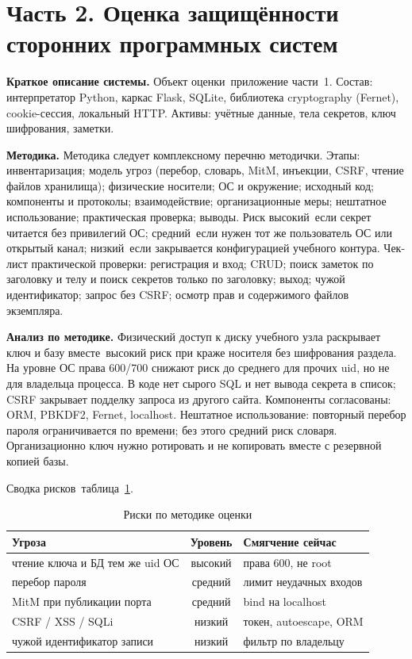 \section{Часть 2. Оценка защищённости сторонних программных систем}
\label{sec:part2}

\textbf{Краткое описание системы.}
Объект оценки~\mdash  приложение части~1. Состав: интерпретатор Python, каркас Flask, SQLite, библиотека cryptography (Fernet), cookie-сессия, локальный HTTP. Активы: учётные данные, тела секретов, ключ шифрования, заметки.

\textbf{Методика.}
Методика следует комплексному перечню методички. Этапы: инвентаризация; модель угроз (перебор, словарь, MitM, инъекции, CSRF, чтение файлов хранилища); физические носители; ОС и окружение; исходный код; компоненты и протоколы; взаимодействие; организационные меры; нештатное использование; практическая проверка; выводы. Риск высокий~\mdash  если секрет читается без привилегий ОС; средний~\mdash  если нужен тот же пользователь ОС или открытый канал; низкий~\mdash  если закрывается конфигурацией учебного контура. Чек-лист практической проверки: регистрация и вход; CRUD; поиск заметок по заголовку и телу и поиск секретов только по заголовку; выход; чужой идентификатор; запрос без CSRF; осмотр прав и содержимого файлов экземпляра.

\textbf{Анализ по методике.}
Физический доступ к диску учебного узла раскрывает ключ и базу вместе~\mdash  высокий риск при краже носителя без шифрования раздела. На уровне ОС права 600/700 снижают риск до среднего для прочих uid, но не для владельца процесса. В коде нет сырого SQL и нет вывода секрета в список; CSRF закрывает подделку запроса из другого сайта. Компоненты согласованы: ORM, PBKDF2, Fernet, localhost. Нештатное использование: повторный перебор пароля ограничивается по времени; без этого средний риск словаря. Организационно ключ нужно ротировать и не копировать вместе с резервной копией базы.

Сводка рисков~\mdash  таблица~\ref{tab:risks}.

\begin{table}[H]
	\begin{tabularx}{\textwidth}{|X|c|X|}
		\hline
		\textbf{Угроза} & \textbf{Уровень} & \textbf{Смягчение сейчас} \\
		\hline
		чтение ключа и БД тем же uid ОС & высокий & права 600, не root \\
		\hline
		перебор пароля & средний & лимит неудачных входов \\
		\hline
		MitM при публикации порта & средний & bind на localhost \\
		\hline
		CSRF / XSS / SQLi & низкий & токен, autoescape, ORM \\
		\hline
		чужой идентификатор записи & низкий & фильтр по владельцу \\
		\hline
	\end{tabularx}
	\caption{Риски по методике оценки}
	\label{tab:risks}
\end{table}

